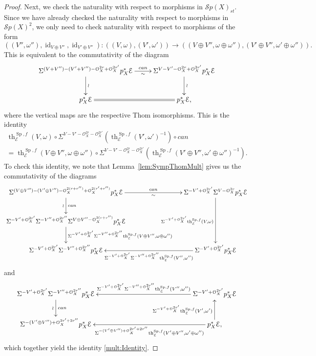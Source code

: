 \documentclass[10pt]{amsart}
\theoremstyle{definition}
\theoremstyle{plain}
\numberwithin{equation}{section}
\newcommand{\0}{\emptyset}
\newcommand{\sE}{{\mathcal E}}
\newcommand{\sO}{{\mathcal O}}
\newcommand{\sS}{{\mathcal S}}
\newcommand{\Sp}{{\operatorname{Sp}}}
\renewcommand{\th}{{\operatorname{th}}}
\newcommand{\id}{{\operatorname{id}}}
\begin{document}
\begin{proof}
Next, we check the naturality with respect to morphisms in $\sS{p}(X)_{st}$. Since we have already checked  the naturality with respect to morphisms in $\sS{p}(X)^2$, we only need to check  naturality with respect to morphisms of the form
$$((V'',\omega''),\id_{V\oplus V''},\id_{V'\oplus V''}):((V,\omega), (V',\omega'))\to((V\oplus V'',\omega\oplus \omega''), (V'\oplus V'',\omega'\oplus \omega'')).$$
This is equivalent to the commutativity of the diagram
\[
\xymatrix{
\Sigma^{(V+V'')-(V'+V'')-\sO_X^{2r}+\sO_X^{2r'}}p_X^*\sE\ar[d]^\wr\ar[r]^-{can}_-\sim&\Sigma^{V-V'-\sO_X^{2r}+\sO_X^{2r'}}p_X^*\sE\ar[d]^\wr\\
p_X^*\sE\ar@{=}[r]&p_X^*\sE,
}
\]
where the vertical maps are the respective Thom isomorphisms. This is the identity
\begin{multline}\label{mult:Identity}
\th^{\Sp,f}_{\sE}(V,\omega)\circ \Sigma^{V-V'-\sO_X^{2r}-\sO_X^{2r'}}(\th^{\Sp,f}_{\sE}(V',\omega')^{-1})\circ {can}\\=
\th^{\Sp,f}_{\sE}(V\oplus V'',\omega\oplus \omega'')\circ \Sigma^{V-V'-\sO_X^{2r}-\sO_X^{2r'}}(\th^{\Sp,f}_{\sE}(V'\oplus V'',\omega'\oplus \omega'')^{-1}).
\end{multline}
To check this identity, we note that Lemma~\ref{lem:SympThomMult} gives us the commutativity of the diagrams
\[
\xymatrix{
 \Sigma^{(V\oplus V'')-(V'\oplus V'')-\sO_X^{2(r+r'')}+\sO_X^{2(r'+r'')}}p_X^*\sE\ar[rrr]^-{can}_-\sim
\ar[d]^-{can}_-\wr&&& \Sigma^{-V'+\sO_X^{2r'}}\Sigma^{V-\sO_X^{2r}}p_X^*\sE
\ar[dd]_-{\Sigma^{-V'+\sO_X^{2r'}}\th^{\Sp,f}_{\sE}(V,\omega)} \\
 \Sigma^{-V'+\sO_X^{2r'}}\Sigma^{-V''+\sO_X^{2r''}}\Sigma^{V\oplus V''-\sO_X^{2(r+r'')}}p_X^*\sE
 \ar[d]^-{\Sigma^{-V'+\sO_X^{2r'}}\Sigma^{-V''+\sO_X^{2r''}}\th^{\Sp,f}_{\sE}(V\oplus V'',\omega\oplus\omega'')}\\
\Sigma^{-V'+\sO_X^{2r'}}\Sigma^{-V''+\sO_X^{2r''}}p_X^*\sE&&& \Sigma^{-V'+\sO_X^{2r'}}p_X^*\sE\ar[lll]^-{\Sigma^{-V'+\sO_X^{2r'}}\Sigma^{-V''+\sO_X^{2r''}}\th^{\Sp,f}_{\sE}(V'',\omega'')}
}
\]
and
\[
\xymatrixcolsep{30pt}
\xymatrix{
\Sigma^{-V'+\sO_X^{2r'}}\Sigma^{-V''+\sO_X^{2r''}}p_X^*\sE\ar[d]^-{can}_-\wr&&&& \Sigma^{-V'+\sO_X^{2r'}}p_X^*\sE\ar[llll]_-{\Sigma^{-V'+\sO_X^{2r'}}\Sigma^{-V''+\sO_X^{2r''}}\th^{\Sp,f}_{\sE}(V'',\omega'')}\\
\Sigma^{-(V'\oplus V'')+\sO_X^{2r'+2r''}}p_X^*\sE&&&&
\ar[llll]^-{\Sigma^{-(V'\oplus V'')+\sO_X^{2r'+2r''}}\th^{\Sp,f}_{\sE}(V'\oplus V'',\omega'\oplus \omega'')}p_X^*\sE,\ar[u]^-{\Sigma^{-V'+\sO_X^{2r'}}\th^{\Sp,f}_{\sE}(V',\omega')}
}
\]
which together yield the identity \eqref{mult:Identity}.


\end{proof}
\end{document}
